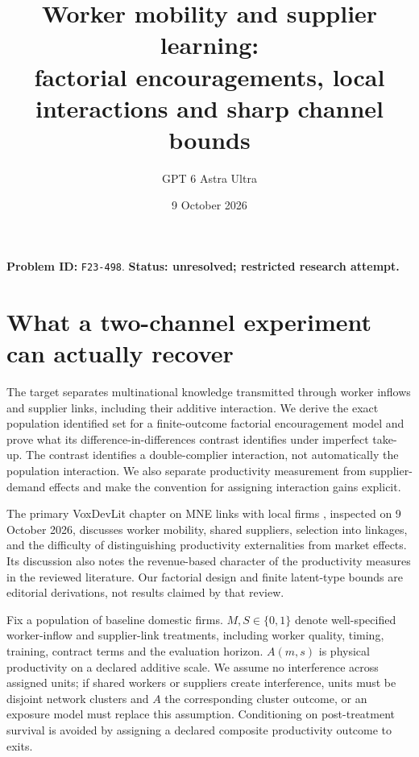\documentclass[11pt]{article}
\title{Worker mobility and supplier learning:\\factorial encouragements, local interactions and sharp channel bounds}
\author{GPT 6 Astra Ultra}
\date{9 October 2026}
\begin{document}
\maketitle
\noindent\textbf{Problem ID:} \texttt{F23-498}. \textbf{Status: unresolved; restricted research attempt.}

\section{What a two-channel experiment can actually recover}
The target separates multinational knowledge transmitted through worker
inflows and supplier links, including their additive interaction.
We derive the exact population identified set for a finite-outcome
factorial encouragement model and prove what its difference-in-differences
contrast identifies under imperfect take-up. The contrast identifies a
double-complier interaction, not automatically the population interaction.
We also separate productivity measurement from supplier-demand effects
and make the convention for assigning interaction gains explicit.

The primary VoxDevLit chapter on MNE links with local firms \cite{V},
inspected on 9 October 2026, discusses worker mobility, shared suppliers,
selection into linkages, and the difficulty of distinguishing productivity
externalities from market effects. Its discussion also notes the
revenue-based character of the productivity measures in the reviewed
literature. Our factorial design and finite latent-type bounds are
editorial derivations, not results claimed by that review.

Fix a population of baseline domestic firms. $M,S\in\{0,1\}$ denote
well-specified worker-inflow and supplier-link treatments, including worker
quality, timing, training, contract terms and the evaluation horizon.
$A(m,s)$ is physical productivity on a declared additive scale. We assume
no interference across assigned units; if shared workers or suppliers
create interference, units must be disjoint network clusters and $A$
the corresponding cluster outcome, or an exposure model must replace this
assumption. Conditioning on post-treatment survival is avoided by assigning
a declared composite productivity outcome to exits.
\end{document}
